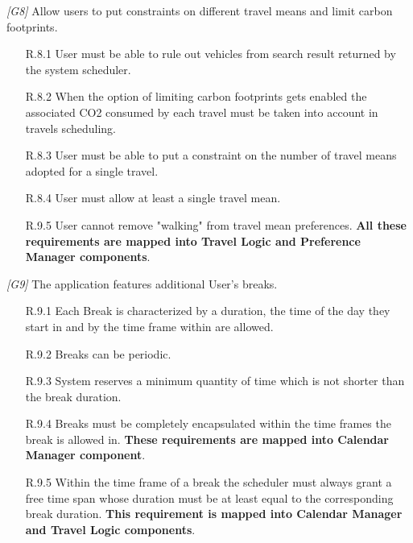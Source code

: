\begin{description}
	\vskip0.75cm
	\item \textit{[G8]} Allow users to put constraints on different travel means and limit carbon footprints.
		\begin{itemize}
			\item[R.8.1] User must be able to rule out vehicles from search result returned by the system scheduler.

			\item[R.8.2] When the option of limiting carbon footprints gets enabled the associated CO2 consumed by each travel must be taken into account in travels scheduling.

			\item[R.8.3] User must be able to put a constraint on the number of travel means adopted for a single travel.

			\item[R.8.4] User must allow at least a single travel mean.

			\item[R.9.5] User cannot remove "walking" from travel mean preferences.		
			\textbf{All these requirements are mapped into Travel Logic and Preference Manager components}.
		\end{itemize}


	\vskip0.75cm
	\item \textit{[G9]} The application features additional User’s breaks.
		\begin{itemize}
			\item [R.9.1] Each Break is characterized by a duration, the time of the day they start in and by the time frame within are allowed.

			\item[R.9.2] Breaks can be periodic.

			\item[R.9.3] System reserves a minimum quantity of time which is not shorter than the break duration.

			\item[R.9.4] Breaks must be completely encapsulated within the time frames the break is allowed in.
			\textbf{These requirements are mapped into Calendar Manager component}.
			
			\item[R.9.5] Within the time frame of a break the scheduler must always grant a free time span whose duration must be at least equal to the corresponding break duration.
			\textbf{This requirement is mapped into Calendar Manager and Travel Logic components}.
		\end{itemize}



\end{description}
